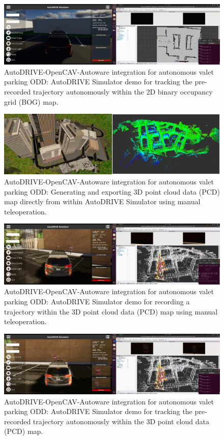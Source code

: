 \begin{figure}[H]
    \centering
    \includegraphics[width=\linewidth]{Figures/fig33.png}
    \caption{AutoDRIVE-OpenCAV-Autoware integration for autonomous valet parking ODD: AutoDRIVE Simulator demo for tracking the pre-recorded trajectory autonomously within the 2D binary occupancy grid (BOG) map.}
    \label{fig: figure33}
\end{figure}

\begin{figure}[H]
    \centering
    \includegraphics[width=\linewidth]{Figures/fig34.png}
    \caption{AutoDRIVE-OpenCAV-Autoware integration for autonomous valet parking ODD: Generating and exporting 3D point cloud data (PCD) map directly from within AutoDRIVE Simulator using manual teleoperation.}
    \label{fig: figure34}
\end{figure}

\begin{figure}[H]
    \centering
    \includegraphics[width=\linewidth]{Figures/fig35.png}
    \caption{AutoDRIVE-OpenCAV-Autoware integration for autonomous valet parking ODD: AutoDRIVE Simulator demo for recording a trajectory within the 3D point cloud data (PCD) map using manual teleoperation.}
    \label{fig: figure35}
\end{figure}

\begin{figure}[H]
    \centering
    \includegraphics[width=\linewidth]{Figures/fig36.png}
    \caption{AutoDRIVE-OpenCAV-Autoware integration for autonomous valet parking ODD: AutoDRIVE Simulator demo for tracking the pre-recorded trajectory autonomously within the 3D point cloud data (PCD) map.}
    \label{fig: figure36}
\end{figure}
